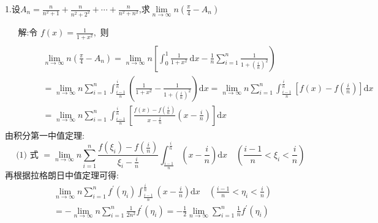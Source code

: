 \documentclass{ctexart}
\begin{document}
	\begin{tcolorbox}[title = {综合性问题},colbacktitle=red!25!white,colback=white,arc = 2mm, outer arc = 2mm,fonttitle = \itshape, fontupper = \itshape, fontlower = \itshape]
    
      1.设$\displaystyle{A_{n}=\frac{n}{n^{2}+1}+\frac{n}{n^{2}+2^{2}}+\cdots+\frac{n}{n^{2}+n^{2}}}$,求$\displaystyle{\lim\limits_{n \to \infty} n\left(\frac{\pi}{4} - A_{n} \right)}$
      \begin{tcolorbox}[colback=white,arc = 1mm, outer arc = 1mm,fonttitle = \itshape, fontupper = \itshape, fontlower = \itshape]

      	$$
      	\begin{aligned}
      		&\text { 解:令 } f(x)=\frac{1}{1+x^{2}}, \text { 则 } \\
      		&\qquad \begin{aligned}
      			& \lim _{n \rightarrow \infty} n\left(\frac{\pi}{4}-A_{n}\right)=\lim _{n \rightarrow \infty} n\left[\int_{0}^{1} \frac{1}{1+x^{2}} \mathrm{~d} x-\frac{1}{n} \sum_{i=1}^{n} \frac{1}{1+\left(\frac{i}{n}\right)^{2}}\right) \\
      			&=\lim _{n \rightarrow \infty} n \sum_{i=1}^{n} \int_{\frac{i-1}{n}}^{\frac{i}{n}}\left(\frac{1}{1+x^{2}}-\frac{1}{1+\left(\frac{i}{n}\right)^{2}}\right) \mathrm{d} x=\lim _{n \rightarrow \infty} n \sum_{i=1}^{n} \int_{\frac{i-1}{n}}^{\frac{i}{n}}\left[f(x)-f\left(\frac{i}{n}\right)\right] \mathrm{d} x \\
      			&=\lim _{n \rightarrow \infty} n \sum_{i=1}^{n} \int_{\frac{i-1}{n}}^{\frac{i}{n}}\left[\frac{f(x)-f\left(\frac{i}{n}\right)}{x-\frac{i}{n}}\left(x-\frac{i}{n}\right)\right] \mathrm{d} x
      		\end{aligned}
      	\end{aligned}
      	$$
      	由积分第一中值定理:
      	$$
      	\text { (1) 式 }=\lim _{n \rightarrow \infty} n \sum_{i=1}^{n} \frac{f\left(\xi_{i}\right)-f\left(\frac{i}{n}\right)}{\xi_{i}-\frac{i}{n}} \int_{\frac{i-1}{n}}^{\frac{i}{n}}\left(x-\frac{i}{n}\right) \mathrm{d} x \quad\left(\frac{i-1}{n}<\xi_{i}<\frac{i}{n}\right)
      	$$
      	再根据拉格朗日中值定理可得:
      	$$
      	\begin{aligned}
      		&\lim _{n \rightarrow \infty} n \sum_{i=1}^{n} f^{\prime}\left(\eta_{i}\right) \int_{\frac{i-1}{n}}^{\frac{i}{n}}\left(x-\frac{i}{n}\right) \mathrm{d} x \quad\left(\frac{i-1}{n}<\eta_{i}<\frac{i}{n}\right) \\
      		&=-\lim _{n \rightarrow \infty}n \sum_{i=1}^{n} \frac{1}{2 n^{2}} f^{\prime}\left(\eta_{i}\right)=-\frac{1}{2} \lim _{n \rightarrow \infty} \sum_{i=1}^{n} \frac{1}{n} f^{\prime}\left(\eta_{i}\right) \\

\end{aligned}$$
\end{tcolorbox}
\end{tcolorbox}
\end{document}
